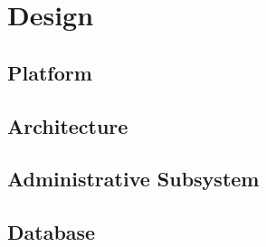 \chapter{Design}
\label{chap:design}






\section{Platform}
\section{Architecture}
\section{Administrative Subsystem}
\section{Database}
